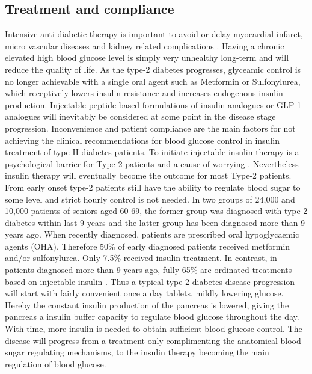 \subsection{Treatment and compliance}
Intensive anti-diabetic therapy is important to avoid or delay myocardial infarct, micro vascular diseases and kidney related complications \cite{holman,boussageon2011effect,gaede2008effect}. Having a chronic elevated high blood glucose level is simply very unhealthy long-term and will reduce the quality of life. As the type-2 diabetes progresses, glyceamic control is no longer achievable with a single oral agent such as Metformin or Sulfonylurea, which receptively lowers insulin resistance and increases endogenous insulin production. Injectable peptide based formulations of insulin-analogues or GLP-1-analogues will inevitably be considered at some point in the disease stage progression. Inconvenience and patient compliance are the main factors for not achieving the clinical recommendations for blood glucose control in insulin treatment of type II diabetes patients. To initiate injectable insulin therapy is a psychological barrier for Type-2 patients and a cause of worrying \cite{korytkowski2002oral}. Nevertheless insulin therapy will eventually become the outcome for most Type-2 patients. From early onset type-2 patients still have the ability to regulate blood sugar to some level and strict hourly control is not needed. In two groups of 24,000 and 10,000 patients of seniors aged 60-69, the former group was diagnosed with type-2 diabetes within last 9 years and the latter group has been diagnosed more than 9 years ago. When recently diagnosed, patients are prescribed oral hypoglycaemic agents (OHA). Therefore 50\% of early diagnosed patients received metformin and/or sulfonylurea. Only 7.5\% received insulin treatment. In contrast, in patients diagnosed more than 9 years ago, fully 65\% are ordinated treatments based on injectable insulin \cite{Elbert2014rates}. Thus a typical type-2 diabetes disease progression will start with fairly convenient once a day tablets, mildly lowering glucose. Hereby the constant insulin production of the pancreas is lowered, giving the pancreas a insulin buffer capacity to regulate blood glucose throughout the day. With time, more insulin is needed to obtain sufficient blood glucose control. The disease will progress from a treatment only complimenting the anatomical blood sugar regulating mechanisms, to the insulin therapy becoming the main regulation of blood glucose.

